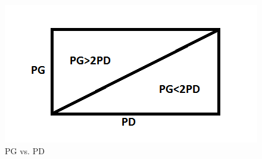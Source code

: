 \documentclass[a4paper,11pt]{article}
\begin{document}
\begin{figure}[h]
\hspace*{-1cm}
        \includegraphics[scale=1]{q6}
        \caption{PG vs. PD}
\end{figure}
\end{document}
